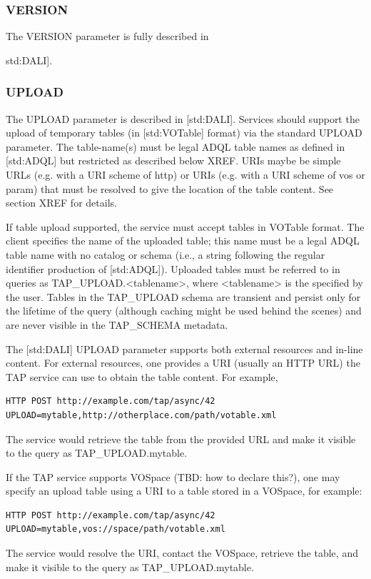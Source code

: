 \documentclass[11pt,letter]{ivoa}
\begin{document}
\subsubsection{VERSION}
The VERSION parameter is fully described in {std:DALI].

\subsubsection{UPLOAD}
\label{sec:UPLOAD}

The UPLOAD parameter is described in [std:DALI]. Services should support the 
upload of temporary tables (in [std:VOTable] format) via the standard UPLOAD 
parameter. The table-name(s) must be legal ADQL table names as defined in 
[std:ADQL] but restricted as described below XREF. URIs maybe be simple URLs 
(e.g. with a URI scheme of http) or URIs (e.g. with a URI scheme of vos or 
param) that must be resolved to give the location of the table content. See 
section XREF for details.

If table upload supported, the service must accept tables in VOTable format. 
The client specifies the name of the uploaded table; this name must be a legal 
ADQL table name with no catalog or schema (i.e., a string following the 
regular identifier production of [std:ADQL]). Uploaded tables must be referred 
to in queries as TAP\_UPLOAD.<tablename>, where <tablename> is the 
specified by the user. Tables in the TAP\_UPLOAD schema are 
transient and persist only for the lifetime of the query (although caching might 
be used behind the scenes) and are never visible in the 
TAP\_SCHEMA metadata.

The [std:DALI] UPLOAD parameter supports both external resources and in-line 
content. For external resources, one provides a URI (usually an HTTP URL) the 
TAP service can use to obtain the table content. For example,
\begin{verbatim}
HTTP POST http://example.com/tap/async/42
UPLOAD=mytable,http://otherplace.com/path/votable.xml
\end{verbatim}
The service would retrieve the table from the provided URL and 
make it visible to the query as TAP\_UPLOAD.mytable.

If the TAP service supports VOSpace (TBD: how to declare this?), one may 
specify an upload table using a URI to a table stored in a VOSpace, for example:
\begin{verbatim}
HTTP POST http://example.com/tap/async/42
UPLOAD=mytable,vos://space/path/votable.xml
\end{verbatim}
The service would resolve the URI, contact the VOSpace, retrieve the table, and 
make it visible to the query as TAP\_UPLOAD.mytable.

}
\end{document}
